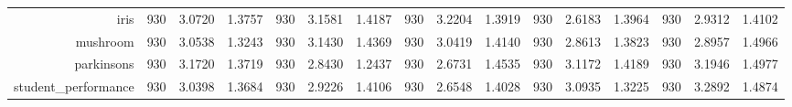 \begin{table}[htbp]
{\begin{tabular}{rccccccccccccccc}
			iris                                & 930                                 & 3.0720                                                                    & 1.3757          & 930                            & 3.1581                                                                             & 1.4187          & 930                             & 3.2204                                                                    & 1.3919          & 930                             & \cellcolor[rgb]{ .776,  .937,  .808}\textcolor[rgb]{ 0,  .38,  0}{2.6183} & 1.3964          & 930                             & 2.9312          & 1.4102          \\
			mushroom                            & 930                                 & 3.0538                                                                    & 1.3243          & 930                            & 3.1430                                                                             & 1.4369          & 930                             & 3.0419                                                                    & 1.4140          & 930                             & \cellcolor[rgb]{ .776,  .937,  .808}\textcolor[rgb]{ 0,  .38,  0}{2.8613} & 1.3823          & 930                             & 2.8957          & 1.4966          \\
			parkinsons                          & 930                                 & 3.1720                                                                    & 1.3719          & 930                            & 2.8430                                                                             & 1.2437          & 930                             & \cellcolor[rgb]{ .776,  .937,  .808}\textcolor[rgb]{ 0,  .38,  0}{2.6731} & 1.4535          & 930                             & 3.1172                                                                    & 1.4189          & 930                             & 3.1946          & 1.4977          \\
			student\_performance                & 930                                 & 3.0398                                                                    & 1.3684          & 930                            & 2.9226                                                                             & 1.4106          & 930                             & \cellcolor[rgb]{ .776,  .937,  .808}\textcolor[rgb]{ 0,  .38,  0}{2.6548} & 1.4028          & 930                             & 3.0935                                                                    & 1.3225          & 930                             & 3.2892          & 1.4874          \\

\end{tabular}}
\end{table}
